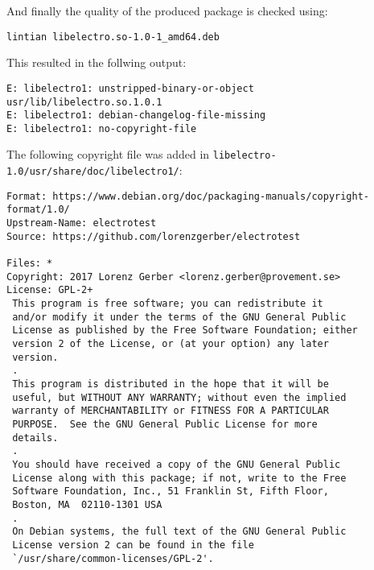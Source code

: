 \documentclass[a4paper,11pt,twoside]{article}
\begin{document}
And finally the quality of the produced package is checked using:
\begin{verbatim}
lintian libelectro.so-1.0-1_amd64.deb
\end{verbatim}

This resulted in the follwing output:
\begin{verbatim}
E: libelectro1: unstripped-binary-or-object usr/lib/libelectro.so.1.0.1
E: libelectro1: debian-changelog-file-missing
E: libelectro1: no-copyright-file
\end{verbatim}

The following copyright file was added in
\verb+libelectro-1.0/usr/share/doc/libelectro1/+:
\begin{verbatim}
Format: https://www.debian.org/doc/packaging-manuals/copyright-format/1.0/
Upstream-Name: electrotest
Source: https://github.com/lorenzgerber/electrotest

Files: *
Copyright: 2017 Lorenz Gerber <lorenz.gerber@provement.se>
License: GPL-2+
 This program is free software; you can redistribute it
 and/or modify it under the terms of the GNU General Public
 License as published by the Free Software Foundation; either
 version 2 of the License, or (at your option) any later
 version.
 .
 This program is distributed in the hope that it will be
 useful, but WITHOUT ANY WARRANTY; without even the implied
 warranty of MERCHANTABILITY or FITNESS FOR A PARTICULAR
 PURPOSE.  See the GNU General Public License for more
 details.
 .
 You should have received a copy of the GNU General Public
 License along with this package; if not, write to the Free
 Software Foundation, Inc., 51 Franklin St, Fifth Floor,
 Boston, MA  02110-1301 USA
 .
 On Debian systems, the full text of the GNU General Public
 License version 2 can be found in the file
 `/usr/share/common-licenses/GPL-2'.
\end{verbatim}
\end{document}
